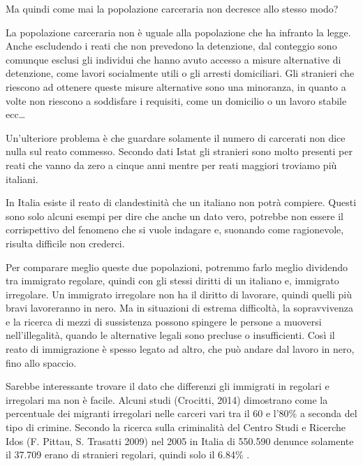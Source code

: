 \documentclass[12pt]{book} %
\begin{document}
Ma quindi come mai la popolazione carceraria non decresce allo stesso modo?

La popolazione carceraria non è uguale alla popolazione che ha infranto la legge. Anche escludendo i reati che non
prevedono la detenzione, dal conteggio sono comunque esclusi gli individui che hanno avuto accesso a misure alternative di
detenzione, come lavori socialmente utili o gli arresti domiciliari. Gli stranieri che riescono ad ottenere queste
misure alternative sono una minoranza, in quanto a volte non riescono a soddisfare i requisiti, come un domicilio o un lavoro stabile ecc…

Un'ulteriore problema è che guardare solamente il numero di carcerati non dice nulla sul reato commesso. Secondo dati Istat gli stranieri sono molto presenti per reati che vanno da zero a cinque anni mentre per reati maggiori troviamo più italiani.

In Italia esiste il reato di clandestinità che un italiano non potrà compiere. 
Questi sono solo alcuni esempi per dire che anche un dato vero, potrebbe non essere il corrispettivo del fenomeno che si vuole indagare e, suonando come ragionevole, risulta difficile non crederci.

Per comparare meglio queste due popolazioni, potremmo farlo meglio dividendo tra immigrato regolare, quindi con gli stessi diritti di un italiano e, immigrato irregolare. Un immigrato irregolare non ha il diritto di lavorare, quindi quelli più
bravi lavoreranno in nero. Ma in situazioni di estrema difficoltà, la sopravvivenza e la ricerca di mezzi di sussistenza possono spingere le persone a muoversi nell'illegalità, quando le alternative legali sono precluse o insufficienti. Così il reato di immigrazione è spesso legato ad altro, che può andare dal lavoro in nero, fino allo spaccio. 

Sarebbe interessante trovare il dato che differenzi gli immigrati in regolari e irregolari ma non è facile. Alcuni studi
(Crocitti,
2014) dimostrano come la percentuale dei migranti irregolari nelle carceri vari tra il 60 e l'80\% a
seconda del tipo di crimine. Secondo la ricerca sulla criminalità del Centro Studi e Ricerche Idos (F. Pittau, S.
Trasatti 2009) nel 2005 in Italia di 550.590 denunce solamente il 37.709 erano di stranieri regolari, quindi solo il
6.84\% .
\end{document}
